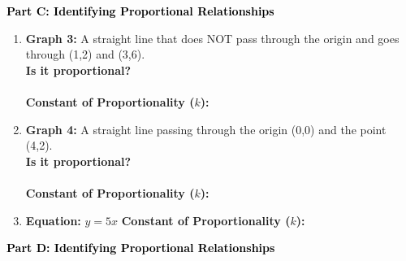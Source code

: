\documentclass[12pt, letterpaper, fleqn]{article}
\newcommand{\blank}{\underline{\hspace{2.2cm}}}
\begin{document}
\newpage

\begin{tcolorbox}[colback=customteal!20]
\large\textcolor{black}{\textbf{Part C: Identifying Proportional Relationships}}
\end{tcolorbox}

\vspace{3mm}

\begin{enumerate}[itemsep=4.2cm, leftmargin=0.6cm, resume]
\item \textbf{Graph 3:} A straight line that does NOT pass through the origin and goes through (1,2) and (3,6). \\ 
\textbf{Is it proportional?} \blank \\ \\
\textbf{Constant of Proportionality ($k$):} \blank
\item \textbf{Graph 4:} A straight line passing through the origin (0,0) and the point (4,2). \\
\textbf{Is it proportional?} \blank \\ \\
\textbf{Constant of Proportionality ($k$):} \blank
\item \textbf{Equation:} $y = 5x$ \qquad
\textbf{Constant of Proportionality ($k$):} \blank
\end{enumerate}

\newpage

\begin{tcolorbox}[colback=customteal!20]
\large\textcolor{black}{\textbf{Part D: Identifying Proportional Relationships}}
\end{tcolorbox}

\vspace{3mm}
\end{document}
